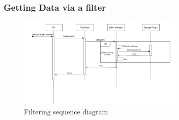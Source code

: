 \documentclass[12pt]{article}
\begin{document}
\newpage
\subsubsection{Getting Data via a filter}
\begin{figure}[ht]
\centering
\includegraphics[width=0.7\textwidth]{Graphics/SeqFilter.png}
\caption{\label{fig:bild18} Filtering sequence diagram}
\end{figure}
\end{document}
